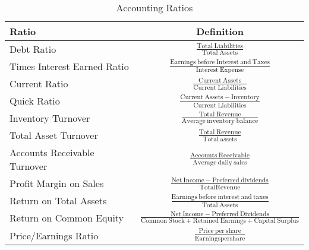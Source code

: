 \documentclass{article}
\begin{document}
\begin{table}
\caption{Accounting Ratios}
\centering
\begin{tabular}[htb]{l|c}
Ratio & Definition\\
\hline
Debt Ratio & $\frac{\mathrm{Total ~ Liabilities}}{\mathrm{Total ~ Assets}}$ \\

Times Interest Earned Ratio & $ \frac{\mathrm{Earnings~before~ Interest ~and ~Taxes}}{\mathrm{Interest ~Expense}} $\\

Current Ratio  & $ \frac{\mathrm{Current ~Assets}}{\mathrm{Current~Liabilities}}$\\

Quick Ratio & $ \frac{\mathrm{Current ~Assets}- \mathrm{Inventory}}{\mathrm{Current~Liabilities}}$\\

Inventory Turnover &  $\frac{\mathrm{Total~ Revenue}}{\mathrm{Average ~inventory ~balance}}$\\
Total Asset Turnover &  $\frac{\mathrm{Total~Revenue}}{\mathrm{Total~assets}}$\\

Accounts Receivable Turnover&  $\frac{\mathrm{Accounts ~Receivable}}{\mathrm{Average~daily~sales}}$\\

Profit Margin on Sales&  $\frac{\mathrm{Net~Income}- \mathrm{Preferred~dividends}}{\mathrm{Total Revenue}}$\\

Return on Total Assets&  $\frac{\mathrm{Earnings~before~interest~and ~taxes}}{\mathrm{Total~Assets}}$\\

Return on Common Equity&  $\frac{\mathrm{Net ~Income}-\mathrm{Preferred~Dividends}}{\mathrm{Common~Stock}+\mathrm{Retained~Earnings}+\mathrm{Capital~Surplus}}$\\

Price/Earnings Ratio&  $\frac{\mathrm{Price~per~share}}{\mathrm{Earnings per share}}$\\
\end{tabular}
\end{table}
\end{document}
